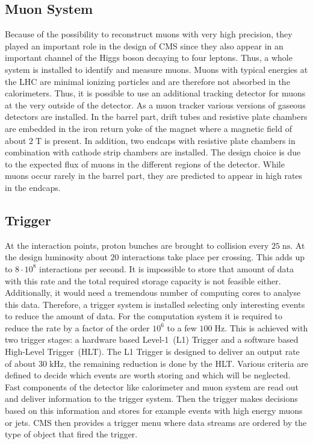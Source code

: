 \subsection{Muon System}
\label{sec:muonsystem}
	Because of the possibility to reconstruct muons with very high precision, they played an important role in the design of CMS since they also appear in an important channel of the Higgs boson decaying to four leptons. Thus, a whole system is installed to identify and measure muons. Muons with typical energies at the LHC are minimal ionizing particles and are therefore not absorbed in the calorimeters. Thus, it is possible to use an additional tracking detector for muons at the very outside of the detector. As a muon tracker various versions of gaseous detectors are installed. In the barrel part, drift tubes and resistive plate chambers are embedded in the iron return yoke of the magnet where a magnetic field of about $2\;\text{T}$ is present. In addition, two endcaps with resistive plate chambers in combination with cathode strip chambers are installed. The design choice is due to the expected flux of muons in the different regions of the detector. While muons occur rarely in the barrel part, they are predicted to appear in high rates in the endcaps.

\subsection{Trigger}
\label{sec:trigger}
	At the interaction points, proton bunches are brought to collision every $25\;\text{ns}$. At the design luminosity about $20$ interactions take place per crossing. This adds up to $8 \cdot 10^8$ interactions per second. It is impossible to store that amount of data with this rate and the total required storage capacity is not feasible either. Additionally, it would need a tremendous number of computing cores to analyse this data. Therefore, a trigger system is installed selecting only interesting events to reduce the amount of data. For the computation system it is required to reduce the rate by a factor of the order $10^6$ to a few $100\;\text{Hz}$. This is achieved with two trigger stages: a hardware based Level-1~(L1) Trigger \cite{L1} and a software based High-Level Trigger~(HLT)\cite{HLT}. The L1 Trigger is designed to deliver an output rate of about $30\;\text{kHz}$, the remaining reduction is done by the HLT. Various criteria are defined to decide which events are worth storing and which will be neglected. Fast components of the detector like calorimeter and muon system are read out and deliver information to the trigger system. Then the trigger makes decisions based on this information and stores for example events with high energy muons or jets. CMS then provides a trigger menu where data streams are ordered by the type of object that fired the trigger.

	